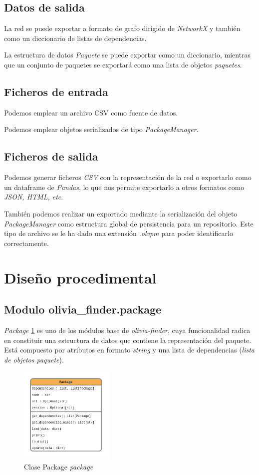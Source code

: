 \subsection{Datos de salida}
La red se puede exportar a formato de grafo dirigido de \textit{NetworkX} y también como
un diccionario de listas de dependencias.

La estructura de datos \textit{Paquete} se puede exportar como un diccionario, mientras
que un conjunto de paquetes se exportará como una lista de objetos \textit{paquetes}.

\subsection{Ficheros de entrada}
Podemos emplear un archivo CSV como fuente de datos.

Podemos emplear objetos serializados de tipo \textit{PackageManager}.

\subsection{Ficheros de salida}
Podemos generar ficheros \textit{CSV} con la representación de la red o exportarlo como un dataframe de \textit{Pandas},
lo que nos permite exportarlo a otros formatos como \textit{JSON, HTML, etc}.

También podemos realizar un exportado mediante la serialización del objeto \textit{PackageManager}
como estructura global de persistencia para un repositorio. Este tipo de archivo se le ha dado una
extensión \textit{.olvpm} para poder identificarlo correctamente.

\section{Diseño procedimental}

\subsection{Modulo olivia\_finder.package}

\textit{Package} \ref{fig:package} es uno de los módulos base de \textit{olivia-finder}, cuya funcionalidad radica en
constituir una estructura de datos que contiene la representación del paquete. Está compuesto por
atributos en formato \textit{string} y una lista de dependencias (\textit{lista de objetos paquete}).

\begin{figure}[h!]
    \centering
    \includegraphics[width=0.4\textwidth]{img/anexos/package.png}
    \caption{Clase Package \textit{package}}
    \label{fig:package}
\end{figure}

